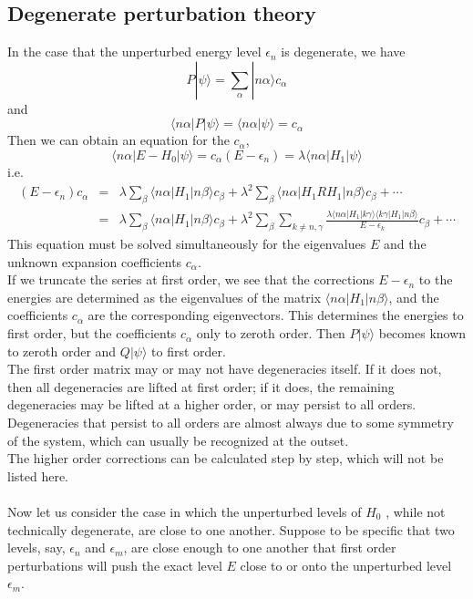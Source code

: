 \documentclass[cyan]{elegantnote}
\begin{document}
\subsection{Degenerate perturbation theory}
In the case that the unperturbed energy level $\epsilon_n$ is degenerate, we have
\[P|\psi\rangle = \sum_{\alpha} |n\alpha\rangle c_{\alpha}\]
and
\[\langle n\alpha | P |\psi\rangle = \langle n\alpha  |\psi\rangle = c_{\alpha}\]
Then we can obtain an equation for the $c_{\alpha}$,
\[\langle n\alpha | E-H_0 | \psi\rangle = c_{\alpha}(E-\epsilon_n) = \lambda \langle n\alpha | H_1 | \psi\rangle\]
i.e.
\begin{eqnarray}
(E-\epsilon_{n})c_{\alpha} &=& \lambda \sum_{\beta} \langle n\alpha | H_1 | n\beta\rangle c_{\beta} + \lambda^2 \sum_{\beta} \langle n\alpha | H_1RH_1 | n\beta\rangle c_{\beta} + \cdots \\
&=& \lambda \sum_{\beta} \langle n\alpha | H_1 | n\beta\rangle c_{\beta}
+ \lambda^2 \sum_{\beta} \sum_{k\neq n,\gamma}  \frac{\lambda \langle n\alpha | H_1|k\gamma\rangle \langle k\gamma | H_1 | n\beta \rangle}{E-\epsilon_k}c_{\beta} + \cdots \nonumber
\end{eqnarray}
This equation must be solved simultaneously for the eigenvalues $E$ and the unknown expansion coefficients $c_{\alpha}$.\\
If we truncate the series at first order, we see that the corrections $E-\epsilon_{n}$ to the energies are determined as the eigenvalues of the matrix $\langle n\alpha | H_1 | n\beta\rangle$, and the coefficients $c_{\alpha}$ are the corresponding eigenvectors.
This determines the energies to first order, but the coefficients $c_{\alpha}$ only to zeroth order. Then $P|\psi\rangle$ becomes known to zeroth order and $Q|\psi\rangle$ to first order.\\
The first order matrix may or may not have degeneracies itself. If it does not, then all degeneracies are lifted at first order; if it does, the remaining degeneracies may be lifted at a higher order, or may persist to all orders. Degeneracies that persist to all orders are almost always due to some symmetry of the system, which can usually be recognized at the outset.\\
The higher order corrections can be calculated step by step, which will not be listed here.\\ \\
Now let us consider the case in which the unperturbed levels of $H_0$ , while not technically degenerate, are close to one another. Suppose to be specific that two levels, say, $\epsilon_n$ and $\epsilon_m$, are close enough to one another that first order perturbations will push the exact level $E$ close to or onto the unperturbed level $\epsilon_m$.\\
\end{document}
